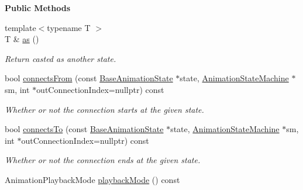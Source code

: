 \begin{Indent}\textbf{ Public Methods}\par
\begin{DoxyCompactItemize}
\item 
\mbox{\label{classrev_1_1_base_animation_state_afc19133ee0dc06e96e49d3ad11f9cdcd}} 
{\footnotesize template$<$typename T $>$ }\\T \& \mbox{\hyperlink{classrev_1_1_base_animation_state_afc19133ee0dc06e96e49d3ad11f9cdcd}{as}} ()
\begin{DoxyCompactList}\small\item\em Return casted as another state. \end{DoxyCompactList}\item 
\mbox{\label{classrev_1_1_base_animation_state_a25f516cdbb3efcf55b293635597bda8d}} 
bool \mbox{\hyperlink{classrev_1_1_base_animation_state_a25f516cdbb3efcf55b293635597bda8d}{connects\+From}} (const \mbox{\hyperlink{classrev_1_1_base_animation_state}{Base\+Animation\+State}} $\ast$state, \mbox{\hyperlink{classrev_1_1_animation_state_machine}{Animation\+State\+Machine}} $\ast$sm, int $\ast$out\+Connection\+Index=nullptr) const
\begin{DoxyCompactList}\small\item\em Whether or not the connection starts at the given state. \end{DoxyCompactList}\item 
\mbox{\label{classrev_1_1_base_animation_state_a6ba8f99de1b9e69911208f1e9767f23a}} 
bool \mbox{\hyperlink{classrev_1_1_base_animation_state_a6ba8f99de1b9e69911208f1e9767f23a}{connects\+To}} (const \mbox{\hyperlink{classrev_1_1_base_animation_state}{Base\+Animation\+State}} $\ast$state, \mbox{\hyperlink{classrev_1_1_animation_state_machine}{Animation\+State\+Machine}} $\ast$sm, int $\ast$out\+Connection\+Index=nullptr) const
\begin{DoxyCompactList}\small\item\em Whether or not the connection ends at the given state. \end{DoxyCompactList}\item 
\mbox{\label{classrev_1_1_base_animation_state_ad0e8f2c480f2f40d33d8b19fc0ef40ba}} 
Animation\+Playback\+Mode \mbox{\hyperlink{classrev_1_1_base_animation_state_ad0e8f2c480f2f40d33d8b19fc0ef40ba}{playback\+Mode}} () const

\end{DoxyCompactItemize}
\end{Indent}
